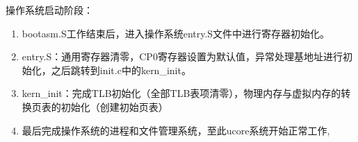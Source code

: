         操作系统启动阶段：
        \begin{enumerate}
            \item
                bootasm.S工作结束后，进入操作系统entry.S文件中进行寄存器初始化。
            \item
                entry.S：通用寄存器清零，CP0寄存器设置为默认值，异常处理基地址进行初始化，之后跳转到init.c中的kern\_init。
            \item
                kern\_init：完成TLB初始化（全部TLB表项清零），物理内存与虚拟内存的转换页表的初始化（创建初始页表）
            \item
                最后完成操作系统的进程和文件管理系统，至此ucore系统开始正常工作,
        \end{enumerate}
        

